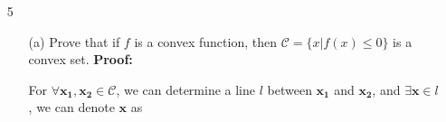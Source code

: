 \documentclass{article}
\renewcommand{\b}[1]{\bm{#1}}
\begin{document}
\begin{enumerate}
\begin{enumerate}
        {\bf Proof:}\par
        Let $\b{F}=||\b{y}-\b{X}\bm{\beta}||_2^2+\lambda||\b{\beta}||_2^2$, then 
        \begin{align*}
            \frac{\partial \b{F}}{\partial \b{\beta}} &=  \frac{\partial ||\b{y}-\b{X}\bm{\beta}||_2^2+\lambda||\b{\beta}||_2^2}{\partial \b{\beta}}\\
            &= \frac{\partial (\b{y}-\b{X\beta})^T(\b{y}-\b{X\beta})}{\partial \b{\beta}}+\lambda\frac{\partial \b{\beta}^T\b{\beta}}{\partial \b{\beta}}\\
            &=-2\b{X}^T(\b{y-X\beta})+2\lambda\b{\beta}=0\\
            &\Rightarrow (\lambda \b{I}+\b{X^T X})\b{\beta}=\b{X^T y}
        \end{align*}
        Given that $\b{X^T X+}\lambda\b{I}$ is invertible, we have
        \[\b{\beta_\star}=\left(\b{X}^T\b{X}+\lambda \b{I}\right)^{-1}\b{X}^T\b{y}\]
        \item[(b)] Discuss the conditions on the matrix $\b{X}$ and $\lambda$ so that the matrix $\b{X^T X+}\lambda\b{I}$ is guaranteed to be invertible.\newline
        {\bf Solution:}\par
        Let $\b{A} = \left(\b{X^T X}+\right)\lambda \b{I}$, then we know that $\b{A}$ is a symmetric matrix. Next, for any non-zero vector $\b{v}$, we have 
        \begin{align*}
            \b{v^T A v} &= \b{v^TX^TXv}+\lambda \b{v^TIv}\\
            &=||\b{Xv}||_2^2+\lambda||\b{v}||_2^2
        \end{align*}
        since $\b{v}$ is a non-zero vector, then $||\b{v}||_2^2 \neq 0$. Moreover, $\lambda > 0$, then 
        \begin{align*}
            \b{v^T A v} \geq \lambda||\b{v}||_2^2> 0
        \end{align*}
        Thus, $\b{A}$ is a positive definite matrix and $\b{A}$ is invertible.
    \end{enumerate}
    \item[5]    
    \begin{enumerate}
    \setlength\parindent{2em}
        \item[(a)] Prove that if $f$ is a convex function, then $\mathcal{C}=\{x|f(x)\leq 0\}$ is a convex set.\newline
        {\bf Proof:}\par
        For $\forall \b{x_1, x_2}\in \mathcal{C}$, we can determine a line $l$ between $\b{x_1}$ and $\b{x_2}$, and $ \exists \b{x}\in l$, we can denote $\b{x}$ as 

\end{enumerate}
\end{enumerate}
\end{document}
